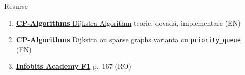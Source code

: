 \documentclass[10pt]{beamer}
\begin{document}
\begin{frame}[fragile]{Resurse}
  \begin{enumerate}
    \item \href{https://cp-algorithms.com/graph/dijkstra.html}{\textbf{CP-Algorithms} \textemdash{} Dijkstra Algorithm}
          \textemdash{} teorie, dovadă, implementare (EN)
    \item \href{https://cp-algorithms.com/graph/dijkstra_sparse.html}{\textbf{CP-Algorithms} \textemdash{} Dijkstra on sparse graphs}
          \textemdash{} varianta cu \texttt{priority\_queue} (EN)
    \item \href{https://cdn.sepi.ro/infobits-f1.pdf#page=167}{\textbf{Infobits Academy F1}}
          \textemdash{} p.\ 167 (RO)
  \end{enumerate}
\end{frame}
\end{document}
